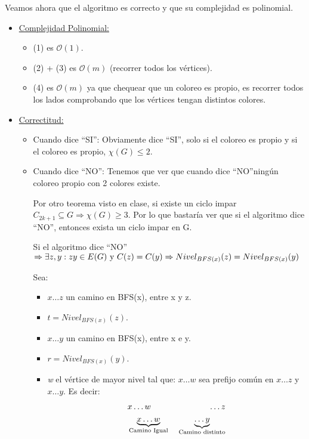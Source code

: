 \documentclass[12pt,a4paper]{report}
\begin{document}
			\par Veamos ahora que el algoritmo es correcto y que su complejidad es polinomial.
			\begin{itemize}
				\item \underline{Complejidad Polinomial:}
					\begin{itemize}
						\item (1) es $\mathcal{O}(1)$.
						\item (2) + (3) es $\mathcal{O}(m)$ (recorrer todos los vértices).
						\item (4) es $\mathcal{O}(m)$ ya que chequear que un coloreo es propio, es recorrer todos los lados comprobando que los vértices tengan distintos colores.
					\end{itemize}
				\item \underline{Correctitud:}
					\begin{itemize}
						\item Cuando dice \textquotedblleft SI\textquotedblright: Obviamente dice \textquotedblleft SI\textquotedblright, solo si el coloreo es propio y si el coloreo es propio, $\chi(G) \leq 2$.
						\item Cuando dice \textquotedblleft NO\textquotedblright: Tenemos que ver que cuando dice \textquotedblleft NO\textquotedblright ningún coloreo propio con 2 colores existe.

							\vspace{5mm}
							\par Por otro teorema visto en clase, si existe un ciclo impar $C_{2k + 1} \subseteq G \Rightarrow \chi(G) \geq 3$. Por lo que bastaría ver que si el algoritmo dice \textquotedblleft NO\textquotedblright, entonces exista un ciclo impar en G.

							\vspace{5mm}
							\par Si el algoritmo dice \textquotedblleft NO\textquotedblright $\Rightarrow \exists z, y : zy \in E(G) \textup{ y } C(z) = C(y) \Rightarrow Nivel_{BFS(x)}(z) = Nivel_{BFS(x)}(y)$

							\vspace{5mm}
							\par Sea:
							\begin{itemize}
								\item $x \dotsc z$ un camino en BFS(x), entre x y z.
								\item $t = Nivel_{BFS(x)}(z)$.
								\item $x \dotsc y$ un camino en BFS(x), entre x e y.
								\item $r = Nivel_{BFS(x)}(y)$.
								\item \textit{w} el vértice de mayor nivel tal que: $x \dotsc w$ sea prefijo común en $x \dotsc z$ y $x \dotsc y$. Es decir:
									\begin{eqnarray}
										\nonumber &x \dotsc w & \qquad \dotsc z \\
										\nonumber &\underbrace{x \dotsc w}_{\textup{Camino Igual}}& \; \underbrace{\dotsc y}_{\textup{Camino distinto}}
									\end{eqnarray}
							\end{itemize}


\end{itemize}
\end{itemize}
\end{document}
